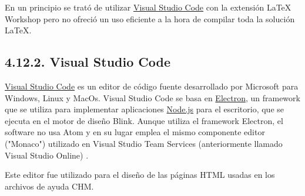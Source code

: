 En un principio se trató de utilizar \href{https://code.visualstudio.com/}{Visual Studio Code} con la extensión LaTeX Workshop pero no ofreció un uso eficiente a la hora de compilar toda la solución \LaTeX.

\subsection{4.12.2. Visual Studio Code}

\href{https://code.visualstudio.com/}{Visual Studio Code} es un editor de código fuente desarrollado por Microsoft para Windows, Linux y MacOs. Visual Studio Code se basa en \href{https://electronjs.org/}{Electron}, un framework que se utiliza para implementar aplicaciones \href{https://nodejs.org/es/}{Node.js} para el escritorio, que se ejecuta en el motor de diseño Blink. Aunque utiliza el framework Electron, el software no usa Atom y en su lugar emplea el mismo componente editor ("Monaco") utilizado en Visual Studio Team Services (anteriormente llamado Visual Studio Online) \cite{wiki:vsCode}.

Este editor fue utilizado para el diseño de las páginas HTML usadas en los archivos de ayuda CHM.